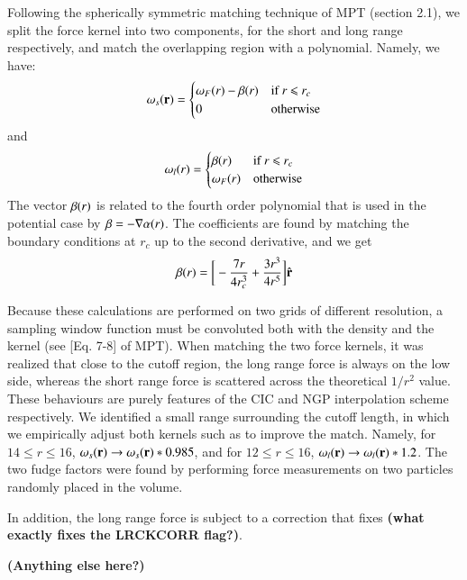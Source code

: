 Following the spherically symmetric matching technique of MPT (section 2.1), 
we split  the force kernel into two components, for the short and long range respectively, and 
match the overlapping region with a polynomial. Namely, we have:
\begin{eqnarray}
{\bf \omega}_{s}({\bf r}) = \begin{cases} {\bf \omega}_{F}(r) -  {\bf \beta}(r) &\mbox{if  } \mbox{$r$ $\le$ $r_{c}$ } \\
0 & \mbox{otherwise} 
\end{cases}
\end{eqnarray}
and
\begin{eqnarray}
{\bf \omega}_{l}(r) = \begin{cases} {\bf \beta}(r) &\mbox{if  } \mbox{$r$ $\le$ $r_{c}$ } \\
 {\bf\omega}_{F}(r)  &\mbox{otherwise} 
\end{cases}
\end{eqnarray}
The vector $ {\bf \beta}(r)$ is related to the fourth order polynomial that is used in the potential case by
 $ {\bf \beta} = - {\bf \nabla} \alpha(r)$. The coefficients are found by matching the boundary conditions at $r_{c}$ up to the second derivative,
 and we get
  \begin{eqnarray}
   {\bf \beta}(r) = \bigg[ -\frac{7 r}{4 r_{c}^{3}} + \frac{3 r^{3}}{4 r^{5}}\bigg] \hat{\bf r}
  \end{eqnarray}

Because these calculations are performed on two grids of different resolution, a sampling window function must be convoluted 
both with the density and the kernel (see [Eq. 7-8] of MPT).
When matching the two  force kernels, it was realized that close to the cutoff region, the long range force is always on the low side, whereas 
the short range force is scattered across the theoretical $1/r^2$ value. These behaviours are purely features of the CIC and NGP interpolation scheme 
respectively. We identified a small range surrounding the cutoff length, in which we empirically adjust both kernels such as to improve 
the match. Namely, for $14 \le r \le 16$, ${\bf \omega}_{s}({\bf r}) \rightarrow {\bf \omega}_{s}({\bf r})*0.985$,
and for  $12 \le r \le 16$, ${\bf \omega}_{l}({\bf r}) \rightarrow {\bf \omega}_{l}({\bf r})*1.2$.
The two fudge factors were found by performing force measurements on two particles randomly placed in the volume.
 
In addition, the long range force is subject to a correction that fixes {\bf (what exactly fixes the LRCKCORR flag?)}.

{\bf (Anything else here?)}
